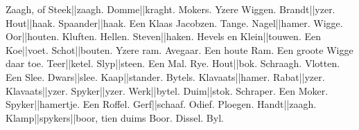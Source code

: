 Zaagh, of Steek||zaagh. 
Domme||kraght. 
Mokers. 
Yzere Wiggen. 
Brandt||yzer. 
Hout||haak. 
Spaander||haak. 
Een Klaas Jacobzen.
Tange. 
Nagel||hamer. 
Wigge. 
Oor||houten. 
Kluften. 
Hellen. 
Steven||haken. 
Hevels en Klein||touwen. 
Een Koe||voet. 
Schot||bouten. 
Yzere ram. 
Avegaar. 
Een houte Ram. 
Een groote Wigge daar toe. 
Teer||ketel. 
Slyp||steen. 
Een Mal. 
Rye. 
Hout||bok. 
Schraagh. 
Vlotten. 
Een Slee. 
Dwars||slee. 
Kaap||stander. 
Bytels. 
Klavaats||hamer. 
Rabat||yzer. 
Klavaats||yzer. 
Spyker||yzer. 
Werk||bytel. 
Duim||stok.
Schraper.
Een Moker. 
Spyker||hamertje. 
Een Roffel. 
Gerf||schaaf. 
Odief. 
Ploegen. 
Handt||zaagh. 
Klamp||spykers||boor, tien duims Boor. 
Dissel. 
Byl. 
